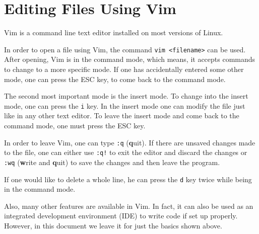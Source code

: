 \section{Editing Files Using Vim}

Vim is a command line text editor installed on most versions of Linux.

In order to open a file using Vim, the command \lstinline{vim <filename>} can be used. After opening, Vim is in the command mode, which means, it accepts commands to change to a more specific mode. If one has accidentally entered some other mode, one can press the ESC key, to come back to the command mode.

The second most important mode is the insert mode. To change into the insert mode, one can press the \lstinline{i} key. In the insert mode one can modify the file just like in any other text editor. To leave the insert mode and come back to the command mode, one must press the ESC key.

In order to leave Vim, one can type \lstinline{:q} (\textbf{q}uit). If there are unsaved changes made to the file, one can either use \lstinline{:q!} to exit the editor and discard the changes or \lstinline{:wq} (\textbf{w}rite and \textbf{q}uit) to save the changes and then leave the program.

If one would like to delete a whole line, he can press the \lstinline{d} key twice while being in the command mode.

Also, many other features are available in Vim. In fact, it can also be used as an integrated development environment (IDE) to write code if set up properly. However, in this document we leave it for just the basics shown above.